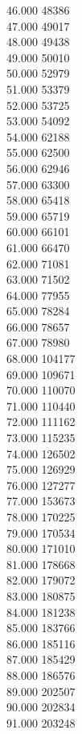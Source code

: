 { 46.000	48386 \\
 47.000	49017 \\
 48.000	49438 \\
 49.000	50010 \\
 50.000	52979 \\
 51.000	53379 \\
 52.000	53725 \\
 53.000	54092 \\
 54.000	62188 \\
 55.000	62500 \\
 56.000	62946 \\
 57.000	63300 \\
 58.000	65418 \\
 59.000	65719 \\
 60.000	66101 \\
 61.000	66470 \\
 62.000	71081 \\
 63.000	71502 \\
 64.000	77955 \\
 65.000	78284 \\
 66.000	78657 \\
 67.000	78980 \\
 68.000	104177 \\
 69.000	109671 \\
 70.000	110070 \\
 71.000	110440 \\
 72.000	111162 \\
 73.000	115235 \\
 74.000	126502 \\
 75.000	126929 \\
 76.000	127277 \\
 77.000	153673 \\
 78.000	170225 \\
 79.000	170534 \\
 80.000	171010 \\
 81.000	178668 \\
 82.000	179072 \\
 83.000	180875 \\
 84.000	181238 \\
 85.000	183766 \\
 86.000	185116 \\
 87.000	185429 \\
 88.000	186576 \\
 89.000	202507 \\
 90.000	202834 \\
 91.000	203248 \\
}
